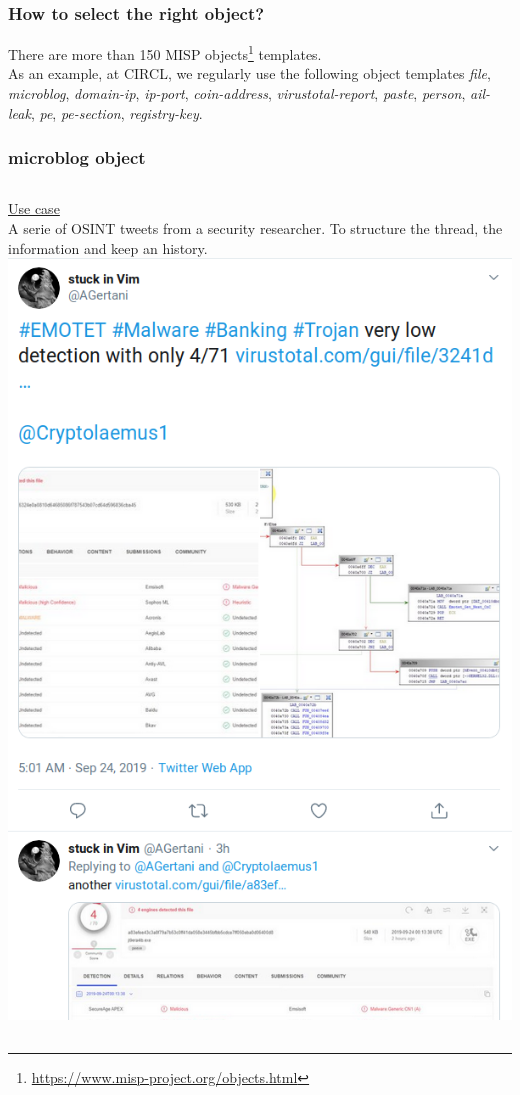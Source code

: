 \begin{frame}
       \frametitle{How to select the right object?}

        There are more than 150 MISP objects\footnote{\url{https://www.misp-project.org/objects.html}} templates.\\
      As an example, at CIRCL, we regularly use the following object templates {\it file}, {\it microblog}, {\it domain-ip}, {\it ip-port}, {\it coin-address}, {\it virustotal-report}, {\it paste}, {\it person}, {\it ail-leak}, {\it pe}, {\it pe-section}, {\it registry-key}.\\
\end{frame}

\begin{frame}
\frametitle{microblog object}
\begin{columns}[totalwidth=\textwidth]
        \underline{Use case}\\
A serie of OSINT tweets from a security researcher.
To structure the thread, the information
and keep an history.\\
        \includegraphics[scale=0.15]{emotet.png}

\end{columns}
\end{frame}
